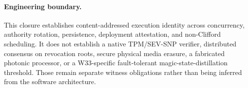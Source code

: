 \paragraph{Engineering boundary.}
This closure establishes content-addressed execution identity across concurrency, authority rotation, persistence, deployment attestation, and non-Clifford scheduling.  It does not establish a native TPM/SEV-SNP verifier, distributed consensus on revocation roots, secure physical media erasure, a fabricated photonic processor, or a W33-specific fault-tolerant magic-state-distillation threshold.  Those remain separate witness obligations rather than being inferred from the software architecture.
